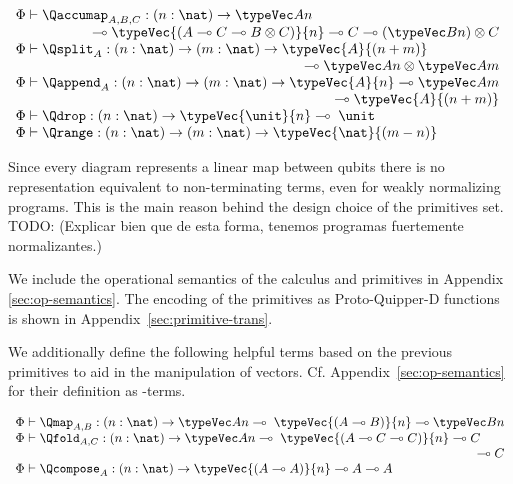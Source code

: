 \begin{center}
$
\begin{array}{l}
    \Phi\vdash \Qaccumap_{A,B,C} : (n:\nat) \to \typeVec A n \;\\
    \multicolumn{1}{r}{\multimap\typeVec{(A \multimap C \multimap B \otimes C)}{n} \multimap C \multimap (\typeVec B n) \otimes C} \\
    \Phi\vdash \Qsplit_A : (n:\nat) \to (m:\nat) \to \typeVec{A}{(n+m)} \\
    \multicolumn{1}{r}{\multimap \typeVec A n \otimes \typeVec A m}\\
    \Phi\vdash \Qappend_A : (n:\nat) \to (m:\nat) \to \typeVec{A}{n} \multimap \typeVec A m \\
    \multicolumn{1}{r}{\qquad\multimap \typeVec{A}{(n+m)}}\\
    \Phi\vdash \Qdrop : (n:\nat) \to \typeVec{\unit}{n} \multimap\; \unit \\
    \Phi\vdash \Qrange : (n:\nat)\to (m:\nat)\to \typeVec{\nat}{(m-n)} \\
\end{array}
$
\end{center}

Since every diagram represents a linear map between qubits there is no
representation equivalent to non-terminating terms, even for weakly normalizing
programs. This is the main reason behind the design choice of the primitives
set. {\color{red}TODO: (Explicar bien que de esta forma, tenemos programas fuertemente normalizantes.)}
%

We include the operational semantics of the calculus and primitives in Appendix~
\ref{sec:op-semantics}. The encoding of the primitives as Proto-Quipper-D functions
is shown in Appendix~\ref{sec:primitive-trans}. 

We additionally define the following helpful terms based on the previous
primitives to aid in the manipulation of vectors.
Cf. Appendix~\ref{sec:op-semantics} for their definition as \lambdaD-terms.
\begin{center}
$
\begin{array}{l}
    \Phi\vdash \Qmap_{A,B} : (n:\nat) \to \typeVec A n \multimap\; \typeVec{(A \multimap B)}{n} \multimap \typeVec B n \\
    \Phi\vdash \Qfold_{A,C} : (n:\nat) \to \typeVec A n \multimap\; \typeVec{(A \multimap C \multimap C)}{n} \multimap C \\
    \multicolumn{1}{r}{\multimap C }\\
    \Phi\vdash \Qcompose_{A} : (n:\nat) \to \typeVec{(A \multimap A)}{n} \multimap A \multimap A \\
\end{array}
$
\end{center}

